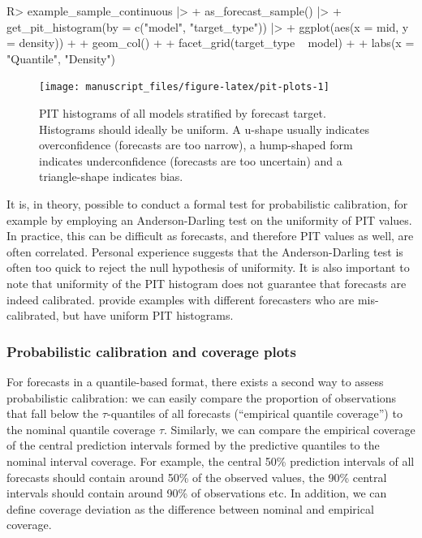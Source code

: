 \documentclass[
]{jss}
\begin{document}
\begin{CodeChunk}
\begin{CodeInput}
R> example_sample_continuous |>
+   as_forecast_sample() |>
+   get_pit_histogram(by = c("model", "target_type")) |>
+   ggplot(aes(x = mid, y = density)) +
+   geom_col() +
+   facet_grid(target_type ~ model) +
+   labs(x = "Quantile", "Density")
\end{CodeInput}
\begin{figure}[!h]

{\centering \texttt{[image: manuscript\_files/figure-latex/pit-plots-1]} 

}

\caption[PIT histograms of all models stratified by forecast target]{PIT histograms of all models stratified by forecast target. Histograms should ideally be uniform. A u-shape usually indicates overconfidence (forecasts are too narrow), a hump-shaped form indicates underconfidence (forecasts are too uncertain) and a triangle-shape indicates bias.}\label{fig:pit-plots}
\end{figure}
\end{CodeChunk}

It is, in theory, possible to conduct a formal test for probabilistic
calibration, for example by employing an Anderson-Darling test on the
uniformity of PIT values. In practice, this can be difficult as
forecasts, and therefore PIT values as well, are often correlated.
Personal experience suggests that the Anderson-Darling test is often too
quick to reject the null hypothesis of uniformity. It is also important
to note that uniformity of the PIT histogram does not guarantee that
forecasts are indeed calibrated.
\cite{gneitingProbabilisticForecastsCalibration2007, hamillInterpretationRankHistograms2001a}
provide examples with different forecasters who are mis-calibrated, but
have uniform PIT histograms.

\subsubsection{Probabilistic calibration and coverage
plots}\label{probabilistic-calibration-and-coverage-plots}

For forecasts in a quantile-based format, there exists a second way to
assess probabilistic calibration: we can easily compare the proportion
of observations that fall below the \(\tau\)-quantiles of all forecasts
(``empirical quantile coverage'') to the nominal quantile coverage
\(\tau\). Similarly, we can compare the empirical coverage of the
central prediction intervals formed by the predictive quantiles to the
nominal interval coverage. For example, the central 50\% prediction
intervals of all forecasts should contain around 50\% of the observed
values, the 90\% central intervals should contain around 90\% of
observations etc. In addition, we can define coverage deviation as the
difference between nominal and empirical coverage.
\end{document}
